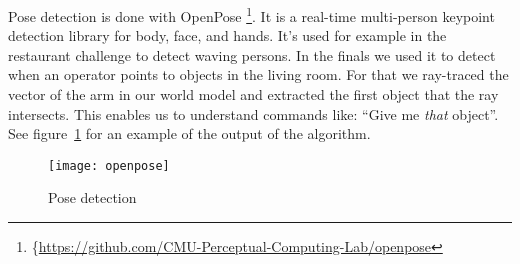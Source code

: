 Pose detection is done with OpenPose \footnote{\{\url{https://github.com/CMU-Perceptual-Computing-Lab/openpose}}.
It is a real-time multi-person keypoint detection library for body, face, and hands.
It's used for example in the restaurant challenge to detect waving persons.
In the finals we used it to detect when an operator points to objects in the living room.
For that we ray-traced the vector of the arm in our world model and extracted the first object that the ray intersects.
This enables us to understand commands like: ``Give me \emph{that} object''.
See figure~\ref{fig:pose_detection} for an example of the output of the algorithm.

\begin{figure}[H]
	\centering
	\texttt{[image: openpose]}
	\caption{Pose detection}
	\label{fig:pose_detection}
\end{figure} 